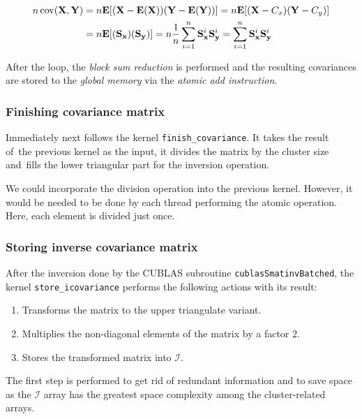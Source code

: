\begin{equation}
\begin{split}
n\operatorname{cov}(\mathbf{X},\mathbf{Y}) &= n\mathbf{E}[(\mathbf{X}-\mathbf{E}(\mathbf{X}))(\mathbf{Y}-\mathbf{E}(\mathbf{Y}))] = n\mathbf{E}[(\mathbf{X}-C_x)(\mathbf{Y}-C_y)] \\ &= n\mathbf{E}[(\mathbf{S_x})(\mathbf{S_y})] = n\frac{1}{n}\sum_{i=1}^{n}{\mathbf{S}_{\mathbf{x}}^{i}\mathbf{S}_{\mathbf{y}}^{i}} = \sum_{i=1}^{n}{\mathbf{S}_{\mathbf{x}}^{i}\mathbf{S}_{\mathbf{y}}^{i}}
\end{split}
\label{eq03:cov}
\end{equation}

After the loop, the \emph{block sum reduction} is performed and the resulting covariances are stored to the \emph{global memory} via the \emph{atomic add instruction}.

\subsubsection{Finishing covariance matrix}
Immediately next follows the kernel \texttt{finish\_covariance}. It takes the result of~the previous kernel as the input, it divides the matrix by the cluster size and~fills the lower triangular part for the inversion operation.

We could incorporate the division operation into the previous kernel. However, it would be needed to be done by each thread performing the atomic operation. Here, each element is divided just once.

\subsubsection{Storing inverse covariance matrix}
After the inversion done by the CUBLAS subroutine \texttt{cublasSmatinvBatched}, the kernel \texttt{store\_icovariance} performs the following actions with its result:
\begin{enumerate}
	\item Transforms the matrix to the upper triangulate variant.
	\item Multiplies the non-diagonal elements of the matrix by a factor $2$.
	\item Stores the transformed matrix into $\mathcal{I}$.
\end{enumerate}

The first step is performed to get rid of redundant information and to save space as the $\mathcal{I}$ array has the greatest space complexity among the cluster-related arrays.

